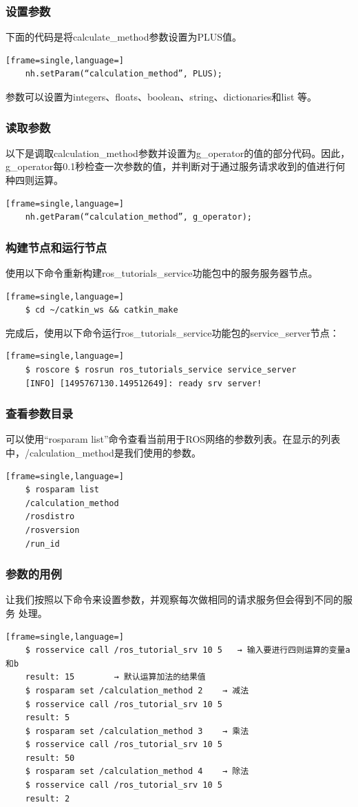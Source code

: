 \documentclass[geye,green,kindle,cn]{elegantnote}
\begin{document}
\subsubsection{设置参数}
下面的代码是将calculate_method参数设置为PLUS值。 
\begin{lstlisting}[frame=single,language=]
    nh.setParam(“calculation_method”, PLUS);
\end{lstlisting} 

参数可以设置为integers、floats、boolean、string、dictionaries和list 等。
\subsubsection{读取参数}
以下是调取calculation_method参数并设置为g_operator的值的部分代码。因此，g_operator每0.1秒检查一次参数的值，并判断对于通过服务请求收到的值进行何种四则运算。
\begin{lstlisting}[frame=single,language=]
    nh.getParam(“calculation_method”, g_operator); 
\end{lstlisting}
\subsubsection{构建节点和运行节点}
使用以下命令重新构建ros_tutorials_service功能包中的服务服务器节点。 
\begin{lstlisting}[frame=single,language=]
    $ cd ~/catkin_ws && catkin_make
\end{lstlisting}

完成后，使用以下命令运行ros_tutorials_service功能包的service_server节点： 
\begin{lstlisting}[frame=single,language=]
    $ roscore $ rosrun ros_tutorials_service service_server 
    [INFO] [1495767130.149512649]: ready srv server! 
\end{lstlisting}
\subsubsection{查看参数目录}
可以使用“rosparam list”命令查看当前用于ROS网络的参数列表。在显示的列表中，/calculation_method是我们使用的参数。
\begin{lstlisting}[frame=single,language=]
    $ rosparam list 
    /calculation_method 
    /rosdistro 
    /rosversion 
    /run_id 
\end{lstlisting}
\subsubsection{参数的用例}
让我们按照以下命令来设置参数，并观察每次做相同的请求服务但会得到不同的服务 处理。 
\begin{lstlisting}[frame=single,language=]
    $ rosservice call /ros_tutorial_srv 10 5   → 输入要进行四则运算的变量a和b 
    result: 15        → 默认运算加法的结果值 
    $ rosparam set /calculation_method 2    → 减法 
    $ rosservice call /ros_tutorial_srv 10 5 
    result: 5 
    $ rosparam set /calculation_method 3    → 乘法 
    $ rosservice call /ros_tutorial_srv 10 5 
    result: 50 
    $ rosparam set /calculation_method 4    → 除法 
    $ rosservice call /ros_tutorial_srv 10 5 
    result: 2  
\end{lstlisting}
\end{document}
